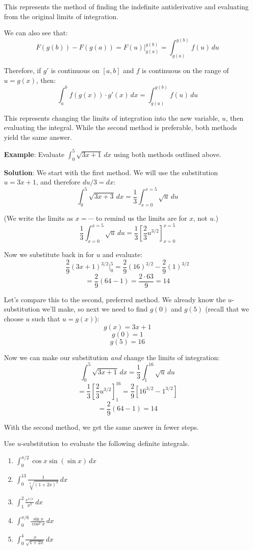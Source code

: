This represents the method of finding the indefinite antiderivative and 
evaluating from the original limits of integration. 

We can also see that:
$$F(g(b)) - F(g(a)) = F(u)|_{g(a)}^{g(b)} = \int_{g(a)}^{g(b)} f(u)\,du$$

Therefore, if $g'$ is continuous on $\left[ a, b \right]$ and $f$ is continuous 
on the range of $u = g(x)$, then:
$$\int_a^b f(g(x)) \cdot g'(x)\,dx = \int_{g(a)}^{g(b)} f(u)\,du$$

This represents changing the limits of integration into the new variable, $u$, 
then evaluating the integral. While the second method is preferable, both 
methods yield the same answer. 

\textbf{Example}: Evaluate $\int_0^{5} \sqrt{3x + 1}\,dx$ using both methods 
outlined above. 

\textbf{Solution}: We start with the first method. We will use the substitution 
$u = 3x + 1$, and therefore $du/3 = dx$:
$$\int_0^5 \sqrt{3x + 3}\,dx = \frac{1}{3} \int_{x = 0}^{x = 5} \sqrt{u}\,du$$

(We write the limits as $x = \cdots$ to remind us the limits are for $x$, not 
$u$.)
$$\frac{1}{3} \int_{x = 0}^{x = 5} \sqrt{u}\,du = \frac{1}{3} \left[ \frac{2}{3} 
u^{3/2} \right]_{x = 0}^{x = 5}$$

Now we substitute back in for $u$ and evaluate:
$$\frac{2}{9} \left( 3x + 1 \right)^{3/2}|_{0}^{5} = \frac{2}{9} \left( 16 
\right)^{3/2} - \frac{2}{9} \left( 1 \right)^{3/2}$$
$$= \frac{2}{9} \left( 64 - 1 \right) = \frac{2 \cdot 63}{9} = 14$$

Let's compare this to the second, preferred method. We already know the 
$u$-substitution we'll make, so next we need to find $g(0)$ and $g(5)$ (recall 
that we choose $u$ such that $u = g(x)$):
$$g(x) = 3x + 1$$
$$g(0) = 1$$
$$g(5) = 16$$

Now we can make our substitution \textit{and} change the limits of integration:
$$\int_0^5 \sqrt{3x + 1}\,dx = \frac{1}{3} \int_1^{16} \sqrt{u}\,du$$
$$= \frac{1}{3} \left[ \frac{2}{3} u^{3/2} \right]_1^{16} = \frac{2}{9} \left[ 
16^{3/2} - 1^{3/2} \right]$$
$$= \frac{2}{9} \left(64 - 1 \right) = 14$$

With the second method, we get the same answer in fewer steps. 

\begin{Exercise}[title = {Definite Integrals and u-substitution}, label = u_def]
Use $u$-substitution to evaluate the following definite integrals. 
\begin{enumerate}
\item $\int_0^{\pi / 2} \cos{x} \sin{ \left( \sin{ x } \right) }\,dx$
\item $\int_0^{13} \frac{1}{\sqrt[3]{\left( 1 + 2x \right)^2}}\,dx$
\item $\int_1^2 \frac{e^{1/x}}{x^2}\,dx$
\item $\int_0^{\pi / 6} \frac{\sin{x}}{\cos^2{x}}\,dx$
\item $\int_0^4 \frac{x}{\sqrt{1 + 2x}}\,dx$
\end{enumerate}
\vspace{50mm}
\end{Exercise}

